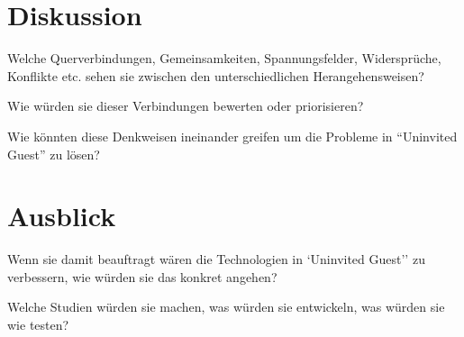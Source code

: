 \documentclass{chi-ext}
\begin{document}


\section{Diskussion}

Welche Querverbindungen, Gemeinsamkeiten, Spannungsfelder, Widersprüche, Konflikte etc. sehen sie zwischen den unterschiedlichen Herangehensweisen? 

Wie würden sie dieser Verbindungen bewerten oder priorisieren? 

Wie könnten diese Denkweisen ineinander greifen um die Probleme in ``Uninvited Guest'' zu lösen? 

\section{Ausblick}

Wenn sie damit beauftragt wären die Technologien in `Uninvited Guest'' zu verbessern, wie würden sie das konkret angehen? 

Welche Studien würden sie machen, was würden sie entwickeln, was würden sie wie testen? 


\balance


\end{document}
